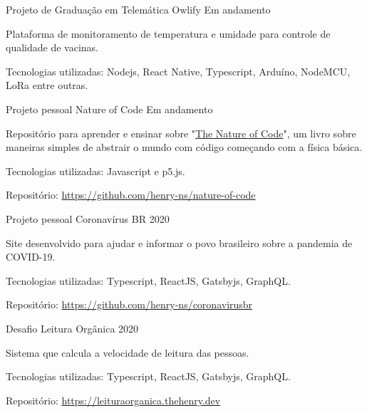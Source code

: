
\begin{cventries}
  \cventry
    {Projeto de Graduação em Telemática} %
    {Owlify} %
    {} %
    {Em andamento} %
    {
      \begin{cvitems} %
        \item {Plataforma de monitoramento de temperatura e umidade para controle de qualidade de vacinas.}
        \item {Tecnologias utilizadas: Nodejs, React Native, Typescript, Arduíno, NodeMCU, LoRa entre outras.}
      \end{cvitems}
    }
      
  \cventry
    {Projeto pessoal} %
    {Nature of Code} %
    {} %
    {Em andamento} %
    {
      \begin{cvitems} %
        \item {Repositório para aprender e ensinar sobre "\href{https://natureofcode.com/}{The Nature of Code}", um livro sobre maneiras simples de abstrair o mundo com código começando com a física básica.}
        \item {Tecnologias utilizadas: Javascript e p5.js.}
        \item {Repositório: \url{https://github.com/henry-ns/nature-of-code}}
      \end{cvitems}
    }

  \cventry
    {Projeto pessoal} %
    {Coronavírus BR} %
    {} %
    {2020} %
    { 
      \begin{cvitems} %
        \item {Site desenvolvido para ajudar e informar o povo brasileiro sobre a pandemia de COVID-19.}
        \item {Tecnologias utilizadas: Typescript, ReactJS, Gatsbyjs, GraphQL.}
        \item {Repositório: \url{https://github.com/henry-ns/coronavirusbr}}
      \end{cvitems}
    }
  
  \cventry
    {Desafio} %
    {Leitura Orgânica} %
    {} %
    {2020} %
    {
      \begin{cvitems} %
        \item {Sistema que calcula a velocidade de leitura das pessoas.}
        \item {Tecnologias utilizadas: Typescript, ReactJS, Gatsbyjs, GraphQL.}
        \item {Repositório: \url{https://leituraorganica.thehenry.dev}}
      \end{cvitems}
    }
  

\end{cventries}
